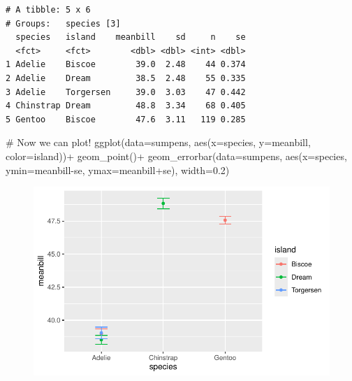 \documentclass[
  letterpaper,
  DIV=11,
  numbers=noendperiod]{scrartcl}
\newenvironment{Shaded}{\begin{snugshade}}{\end{snugshade}}
\newcommand{\AttributeTok}[1]{\textcolor[rgb]{0.40,0.45,0.13}{#1}}
\newcommand{\CommentTok}[1]{\textcolor[rgb]{0.37,0.37,0.37}{#1}}
\newcommand{\FloatTok}[1]{\textcolor[rgb]{0.68,0.00,0.00}{#1}}
\newcommand{\FunctionTok}[1]{\textcolor[rgb]{0.28,0.35,0.67}{#1}}
\newcommand{\NormalTok}[1]{\textcolor[rgb]{0.00,0.23,0.31}{#1}}
\newcommand{\SpecialCharTok}[1]{\textcolor[rgb]{0.37,0.37,0.37}{#1}}
\begin{document}
\begin{verbatim}
# A tibble: 5 x 6
# Groups:   species [3]
  species   island    meanbill    sd     n    se
  <fct>     <fct>        <dbl> <dbl> <int> <dbl>
1 Adelie    Biscoe        39.0  2.48    44 0.374
2 Adelie    Dream         38.5  2.48    55 0.335
3 Adelie    Torgersen     39.0  3.03    47 0.442
4 Chinstrap Dream         48.8  3.34    68 0.405
5 Gentoo    Biscoe        47.6  3.11   119 0.285
\end{verbatim}

\begin{Shaded}
\begin{Highlighting}[]
\CommentTok{\# Now we can plot! }
\FunctionTok{ggplot}\NormalTok{(}\AttributeTok{data=}\NormalTok{sumpens, }\FunctionTok{aes}\NormalTok{(}\AttributeTok{x=}\NormalTok{species, }\AttributeTok{y=}\NormalTok{meanbill, }\AttributeTok{color=}\NormalTok{island))}\SpecialCharTok{+}
  \FunctionTok{geom\_point}\NormalTok{()}\SpecialCharTok{+}
  \FunctionTok{geom\_errorbar}\NormalTok{(}\AttributeTok{data=}\NormalTok{sumpens, }\FunctionTok{aes}\NormalTok{(}\AttributeTok{x=}\NormalTok{species, }\AttributeTok{ymin=}\NormalTok{meanbill}\SpecialCharTok{{-}}\NormalTok{se, }\AttributeTok{ymax=}\NormalTok{meanbill}\SpecialCharTok{+}\NormalTok{se), }\AttributeTok{width=}\FloatTok{0.2}\NormalTok{)}
\end{Highlighting}
\end{Shaded}

\begin{figure}[H]

{\centering \includegraphics{Lab_2_files/figure-pdf/unnamed-chunk-18-1.pdf}

}

\end{figure}
\end{document}
